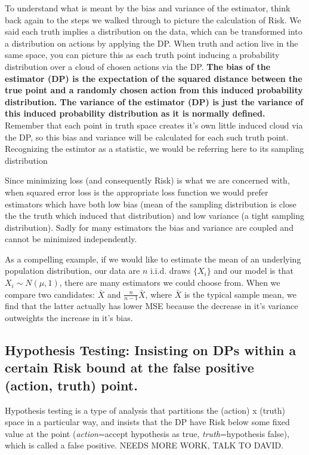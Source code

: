 To understand what is meant by the bias and variance of the estimator, think back again to the steps we walked through to picture the calculation of Risk. We said each truth implies a distribution on the data, which can be transformed into a distribution on actions by applying the DP. When truth and action live in the same space, you can picture this as each truth point inducing a probability distribution over a cloud of chosen actions via the DP. \textbf{The bias of the estimator (DP) is the expectation of the squared distance between the true point and a randomly chosen action from this induced probability distribution. The variance of the estimator (DP) is just the variance of this induced probability distribution as it is normally defined.} Remember that each point in truth space creates it's own little induced cloud via the DP, so this bias and variance will be calculated for each such truth point. Recognizing the estimtor as a statistic, we would be referring here to its sampling distribution
\n

Since minimizing loss (and consequently Risk) is what we are concerned with, when squared error loss is the appropriate loss function we would prefer estimators which have both low bias (mean of the sampling distribution is close the the truth which induced that distribution) and low variance (a tight sampling distribution). Sadly for many estimators the bias and variance are coupled and cannot be minimized independently. 
\n

As a compelling example, if we would like to estimate the mean of an underlying population distribution, our data are $n$ i.i.d. draws $\{X_i\}$ and our model is that $X_i \sim N(\mu, 1)$, there are many estimators we could choose from. When we compare two candidates: $\bar{X}$ and $\frac{n}{n-1}\bar{X}$, where $\bar{X}$ is the typical sample mean, we find that the latter actually has lower MSE because the decrease in it's variance outweights the increase in it's bias.



\subsection{Hypothesis Testing: Insisting on DPs within a certain Risk bound at the false positive (action, truth) point.}
Hypothesis testing is a type of analysis that partitions the (action) x (truth) space in a particular way, and insists that the DP have Risk below some fixed value at the point (\emph{action}=accept hypothesis as true, \emph{truth}=hypothesis false), which is called a false positive.  NEEDS MORE WORK, TALK TO DAVID.


